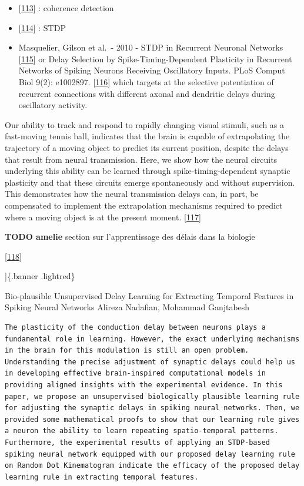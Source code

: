 \begin{itemize}
\tightlist
\item
  {[}\protect\hyperlink{ref-11p3NXmkg}{113}{]} : coherence detection
\item
  {[}\protect\hyperlink{ref-j5xS3owo}{114}{]} : STDP
\item
  Masquelier, Gilson et al.~- 2010 - STDP in Recurrent Neuronal Networks {[}\protect\hyperlink{ref-15TktA0gR}{115}{]} or Delay Selection by Spike-Timing-Dependent Plasticity in Recurrent Networks of Spiking Neurons Receiving Oscillatory Inputs. PLoS Comput Biol 9(2): e1002897. {[}\protect\hyperlink{ref-1FHIKpizQ}{116}{]} which targets at the selective potentiation of recurrent connections with different axonal and dendritic delays during oscillatory activity.
\end{itemize}

Our ability to track and respond to rapidly changing visual stimuli, such as a fast-moving tennis ball, indicates that the brain is capable of extrapolating the trajectory of a moving object to predict its current position, despite the delays that result from neural transmission. Here, we show how the neural circuits underlying this ability can be learned through spike-timing-dependent synaptic plasticity and that these circuits emerge spontaneously and without supervision. This demonstrates how the neural transmission delays can, in part, be compensated to implement the extrapolation mechanisms required to predict where a moving object is at the present moment. {[}\protect\hyperlink{ref-s09KZ8Kh}{117}{]}

\textbf{TODO amelie} section sur l'apprentissage des délais dans la biologie

{[}\protect\hyperlink{ref-UeTLXQCp}{118}{]}

{]}\{.banner .lightred\}

Bio-plausible Unsupervised Delay Learning for Extracting Temporal Features in Spiking Neural Networks
Alireza Nadafian, Mohammad Ganjtabesh

\begin{verbatim}
The plasticity of the conduction delay between neurons plays a fundamental role in learning. However, the exact underlying mechanisms in the brain for this modulation is still an open problem. Understanding the precise adjustment of synaptic delays could help us in developing effective brain-inspired computational models in providing aligned insights with the experimental evidence. In this paper, we propose an unsupervised biologically plausible learning rule for adjusting the synaptic delays in spiking neural networks. Then, we provided some mathematical proofs to show that our learning rule gives a neuron the ability to learn repeating spatio-temporal patterns. Furthermore, the experimental results of applying an STDP-based spiking neural network equipped with our proposed delay learning rule on Random Dot Kinematogram indicate the efficacy of the proposed delay learning rule in extracting temporal features.
\end{verbatim}

